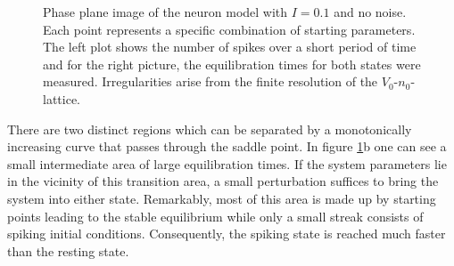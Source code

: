 \documentclass[12pt,a4paper]{article}
\begin{document}
\begin{figure}[H]
	\hspace*{-0.5cm}
	
	\caption{Phase plane image of the neuron model with $I=0.1$ and no noise. Each point represents a specific combination of starting parameters. The left plot shows the number of spikes over a short period of time and for the right picture, the equilibration times for both states were measured. Irregularities arise from the finite resolution of the $V_0$-$n_0$-lattice.}
	\label{twodom}
\end{figure}		
There are two distinct regions which can be separated by a monotonically increasing curve that passes through the saddle point. In figure \ref{twodom}b one can see a small intermediate area of large equilibration times. If the system parameters lie in the vicinity of this transition area, a small perturbation suffices to bring the system into either state. Remarkably, most of this area is made up by starting points leading to the stable equilibrium while only a small streak consists of spiking initial conditions. Consequently, the spiking state is reached much faster than the resting state.
\end{document}

